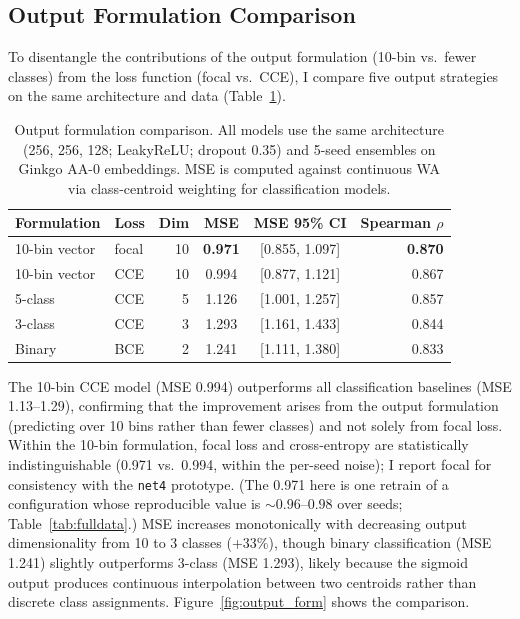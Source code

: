 \documentclass[12pt]{article}
\begin{document}
\subsection{Output Formulation Comparison}
\label{sec:output_formulation}

To disentangle the contributions of the output formulation (10-bin vs.\ fewer classes) from the loss function (focal vs.\ CCE), I compare five output strategies on the same architecture and data (Table~\ref{tab:output_form}).

\begin{table}[H]
\centering
\caption{Output formulation comparison. All models use the same architecture (256, 256, 128; LeakyReLU; dropout 0.35) and 5-seed ensembles on Ginkgo AA-0 embeddings. MSE is computed against continuous WA via class-centroid weighting for classification models.}
\label{tab:output_form}
\begin{tabular}{llrccr}
\toprule
Formulation & Loss & Dim & MSE & MSE 95\% CI & Spearman $\rho$ \\
\midrule
10-bin vector & focal & 10 & \textbf{0.971} & [0.855, 1.097] & \textbf{0.870} \\
10-bin vector & CCE & 10 & 0.994 & [0.877, 1.121] & 0.867 \\
5-class & CCE & 5 & 1.126 & [1.001, 1.257] & 0.857 \\
3-class & CCE & 3 & 1.293 & [1.161, 1.433] & 0.844 \\
Binary & BCE & 2 & 1.241 & [1.111, 1.380] & 0.833 \\
\bottomrule
\end{tabular}
\end{table}

The 10-bin CCE model (MSE 0.994) outperforms all classification baselines (MSE 1.13--1.29), confirming that the improvement arises from the output formulation (predicting over 10 bins rather than fewer classes) and not solely from focal loss.
Within the 10-bin formulation, focal loss and cross-entropy are statistically indistinguishable (0.971 vs.\ 0.994, within the per-seed noise); I report focal for consistency with the \texttt{net4} prototype.
(The 0.971 here is one retrain of a configuration whose reproducible value is ${\sim}0.96$--$0.98$ over seeds; Table~\ref{tab:fulldata}.)
MSE increases monotonically with decreasing output dimensionality from 10 to 3 classes (+33\%), though binary classification (MSE 1.241) slightly outperforms 3-class (MSE 1.293), likely because the sigmoid output produces continuous interpolation between two centroids rather than discrete class assignments.
Figure~\ref{fig:output_form} shows the comparison.
\end{document}
